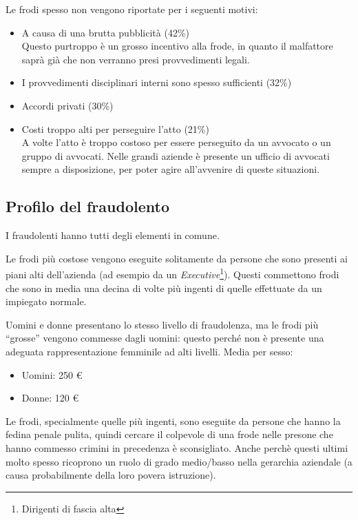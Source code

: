 Le frodi spesso non vengono riportate per i seguenti motivi:
\begin{itemize}
  \item A causa di una brutta pubblicità (42\%) \\
  Questo purtroppo è un grosso incentivo alla frode, in quanto il malfattore
  saprà già che non verranno presi provvedimenti legali.
  \item I provvedimenti disciplinari interni sono spesso sufficienti (32\%)
  \item Accordi privati (30\%)
  \item Costi troppo alti per perseguire l'atto (21\%) \\
  A volte l'atto è troppo costoso per essere perseguito da un avvocato o un
  gruppo di avvocati. Nelle grandi aziende è presente un ufficio di avvocati
  sempre a disposizione, per poter agire all'avvenire di queste situazioni.
\end{itemize}

\subsection{Profilo del fraudolento}

I fraudolenti hanno tutti degli elementi in comune.

Le frodi più costose vengono eseguite solitamente da persone che sono presenti
ai piani alti dell'azienda (ad esempio da un 
\textit{Executive}\footnote{Dirigenti di
fascia alta}). Questi commettono frodi che sono in media una decina di volte
più ingenti di quelle effettuate da un impiegato normale.

Uomini e donne presentano lo stesso livello di fraudolenza, ma le frodi più
``grosse'' vengono commesse dagli uomini: questo perché non è presente una
adeguata rappresentazione femminile ad alti livelli.
Media per sesso:
\begin{itemize}
  \item Uomini: 250 \euro
  \item Donne: 120 \euro
\end{itemize}

Le frodi, specialmente quelle più ingenti, sono eseguite da persone che hanno la fedina
penale pulita, quindi cercare il colpevole di una frode nelle presone che hanno commesso
 crimini in precedenza è sconsigliato. Anche perchè questi ultimi molto spesso ricoprono 
un ruolo di grado medio/basso nella gerarchia aziendale (a causa probabilmente della 
loro povera istruzione).

